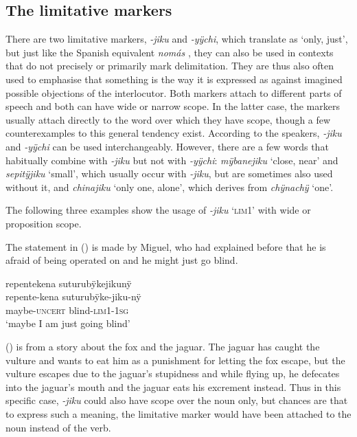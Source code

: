 \subsection{The limitative markers}\label{sec:Limitatives}

There are two limitative markers, \textit{-jiku} and \textit{-yÿchi}, which translate as ‘only, just’, but just like the Spanish equivalent \textit{nomás} \citep[cf.][45--46]{Mendoza2015}, they can also be used in contexts that do not precisely or primarily mark delimitation. They are thus also often used to emphasise that something is the way it is expressed as against imagined possible objections of the interlocutor. Both markers attach to different parts of speech and both can have wide or narrow scope. In the latter case, the markers usually attach directly to the word over which they have scope, though a few counterexamples to this general tendency exist. According to the speakers,  \textit{-jiku} and \textit{-yÿchi} can be used interchangeably. However, there are a few words that habitually combine with \textit{-jiku} but not with \textit{-yÿchi}: \textit{mÿbanejiku} ‘close, near’ and \textit{sepitÿjiku} ‘small’, which usually occur with \textit{-jiku}, but are sometimes also used without it, and \textit{chinajiku} ‘only one, alone’, which derives from \textit{chÿnachÿ} ‘one’.

The following three examples show the usage of \textit{-jiku} ‘\textsc{lim}1’ with wide or proposition scope. 

The statement in () is made by Miguel, who had explained before that he is afraid of being operated on and he might just go blind.

\ea\label{ex:jiku-2}
\begingl
\glpreamble repentekena suturubÿkejikunÿ\\
\gla repente-kena suturubÿke-jiku-nÿ\\
\glb maybe-\textsc{uncert} blind-\textsc{lim}1-1\textsc{sg}\\
\glft ‘maybe I am just going blind’
\endgl
\trailingcitation{[mqx-p110826l.300]}
\xe

() is from a story about the fox and the jaguar. The jaguar has caught the vulture and wants to eat him as a punishment for letting the fox escape, but the vulture escapes due to the jaguar's stupidness and while flying up, he defecates into the jaguar’s mouth and the jaguar eats his excrement instead. Thus in this specific case, \textit{-jiku} could also have scope over the noun only, but chances are that to express such a meaning, the limitative marker would have been attached to the noun instead of the verb.

